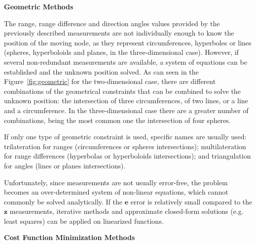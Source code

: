 \begin{description}
	\item \textbf{Geometric Methods}
	
	The range, range difference and direction angles values provided by the previously described measurements are not individually enough to know the position of the moving node, as they represent circumferences, hyperboles or lines (spheres, hyperboloids and planes, in the three-dimensional case). 
	However, if several non-redundant measurements are available, a system of equations can be established and the unknown position solved.
	As can seen in the Figure~\ref{fig:geometric} for the two-dimensional case, there are different combinations of the geometrical constraints that can be combined to solve the unknown position: the intersection of three circumferences, of two lines, or a line and a circumference.
	In the three-dimensional case there are a greater number of combinations, being the most common one the intersection of four spheres.
	
	If only one type of geometric constraint is used, specific names are usually used: trilateration for ranges (circumferences or spheres intersections); multilateration for range differences (hyperbolas or hyperboloids intersections); and triangulation for angles (lines or planes intersections).
		
	
	Unfortunately, since measurements are not usually error-free, the problem becomes an over-determined system of non-linear equations, which cannot commonly be solved analytically.
	If the $\boldsymbol{e}$ error is relatively small compared to the $\boldsymbol{z}$ measurements, iterative methods and approximate closed-form solutions (e.g. least squares) can be applied on linearized functions.
	\item \textbf{Cost Function Minimization Methods}
	

\end{description}

